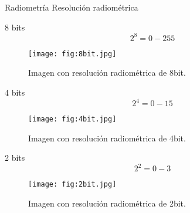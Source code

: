 \begin{frame}{}
  \begin{block}{Radiometría}
    Resolución radiométrica
  \end{block}
\end{frame}

\begin{frame}{}
  \begin{block}{8 bits}
   \begin{equation}
            2^8 = 0-255
        \end{equation}
  \end{block}
\end{frame}


\begin{frame}{}
  \begin{figure}
    \centering
    \texttt{[image: fig:8bit.jpg]}
    \caption{Imagen con resolución radiométrica de 8bit.}
    \label{}
  \end{figure}
\end{frame}


\begin{frame}{}
  \begin{block}{4 bits}
   \begin{equation}
            2^4 = 0-15
        \end{equation}
  \end{block}
\end{frame}


\begin{frame}{}
  \begin{figure}
    \centering
    \texttt{[image: fig:4bit.jpg]}
    \caption{Imagen con resolución radiométrica de 4bit.}
    \label{}
  \end{figure}
\end{frame}


\begin{frame}{}
  \begin{block}{2 bits}
   \begin{equation}
            2^2 = 0-3
        \end{equation}
  \end{block}
\end{frame}


\begin{frame}{}
  \begin{figure}
    \centering
    \texttt{[image: fig:2bit.jpg]}
    \caption{Imagen con resolución radiométrica de 2bit.}
    \label{}
  \end{figure}
\end{frame}



